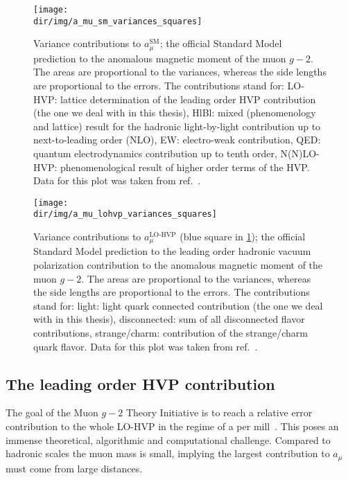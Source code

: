 \begin{figure}
\centering
\texttt{[image: \\dir/img/a\_mu\_sm\_variances\_squares]} %
\caption{
Variance contributions to $a_{\mu}^{\text{SM}}$; the official Standard Model prediction to the anomalous magnetic moment of the muon $g-2$.
The areas are proportional to the variances, whereas the side lengths are proportional to the errors.
The contributions stand for: LO-HVP: lattice determination of the leading order HVP contribution (the one we deal with in this thesis), HlBl: mixed (phenomenology and lattice) result for the hadronic light-by-light contribution up to next-to-leading order (NLO), EW: electro-weak contribution, QED: quantum electrodynamics contribution up to tenth order, N(N)LO-HVP: phenomenological result of higher order terms of the HVP.
Data for this plot was taken from ref.~\cite{snowmass:2025}.
}
\label{fig:a_mu:sm:variances}
\end{figure}

\begin{figure}
\centering
\texttt{[image: \\dir/img/a\_mu\_lohvp\_variances\_squares]}
\caption{
Variance contributions to $a_{\mu}^{\text{LO-HVP}}$ (blue square in \cref{fig:a_mu:sm:variances}); the official Standard Model prediction to the leading order hadronic vacuum polarization contribution to the anomalous magnetic moment of the muon $g-2$.
The areas are proportional to the variances, whereas the side lengths are proportional to the errors.
The contributions stand for: light: light quark connected contribution (the one we deal with in this thesis), disconnected: sum of all disconnected flavor contributions, strange/charm: contribution of the strange/charm quark flavor.
Data for this plot was taken from ref.~\cite{snowmass:2025}.
}
\label{fig:a_mu:lohvp:variances}
\end{figure}





\subsection{The leading order HVP contribution}
\label{sec:lohvp}

The goal of the Muon $g-2$ Theory Initiative is to reach a relative error contribution to the whole LO-HVP in the regime of a per mill~\cite{online:gm2,snowmass:2025}.
This poses an immense theoretical, algorithmic and computational challenge.
Compared to hadronic scales the muon mass is small, implying the largest contribution to $a_{\mu}$ must come from large distances.

